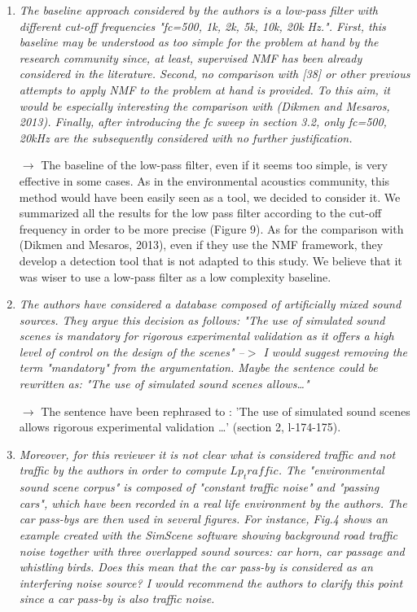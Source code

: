 \documentclass[10pt]{article}
\begin{document}
\begin{enumerate}
\item \emph{The baseline approach considered by the authors is a low-pass filter with different cut-off frequencies "fc={500, 1k, 2k, 5k, 10k, 20k} Hz.". First, this baseline may be understood as too simple for the problem at hand by the research community since, at least, supervised NMF has been already considered in the literature. Second, no comparison with [38] or other previous attempts to apply NMF to the problem at hand is provided. To this aim, it would be especially interesting the comparison with (Dikmen and Mesaros, 2013). Finally, after introducing the fc sweep in section 3.2, only fc={500, 20k}Hz are the subsequently considered with no further justification.}

$\rightarrow$ The baseline of the low-pass filter, even if it seems too simple, is very effective in some cases. As in the environmental acoustics community, this method would have been easily seen as a tool, we decided to consider it. We summarized all the results for the low pass filter according to the cut-off frequency in order to be more precise (Figure 9).
As for the comparison with (Dikmen and Mesaros, 2013), even if they use the NMF framework, they develop a detection tool that is not adapted to this study. We believe that it was wiser to use a low-pass filter as a low complexity baseline.

\item \emph{The authors have considered a database composed of artificially mixed sound sources. They argue this decision as follows: "The use of simulated sound scenes is mandatory for rigorous experimental validation as it offers a high level of control on the design of the scenes" --$>$ I would suggest removing the term "mandatory" from the argumentation. Maybe the sentence could be rewritten as: "The use of simulated sound scenes allows…" }

$\rightarrow$ The sentence have been rephrased to : 'The use of simulated sound scenes allows rigorous experimental validation \dots' (section 2, l-174-175).


\item \emph{Moreover, for this reviewer it is not clear what is considered traffic and not traffic by the authors in order to compute $Lp_traffic$. The "environmental sound scene corpus" is composed of "constant traffic noise" and "passing cars", which have been recorded in a real life environment by the authors. The car pass-bys are then used in several figures. For instance, Fig.4 shows an example created with the SimScene software showing background road traffic noise together with three overlapped sound sources: car horn, car passage and whistling birds. Does this mean that the car pass-by is considered as an interfering noise source? I would recommend the authors to clarify this point since a car pass-by is also traffic noise.}


\end{enumerate}
\end{document}
